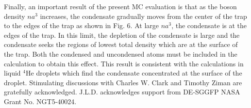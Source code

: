 \documentclass[aps,pra,twocolumn,groupedaddress]{revtex4}
\begin{document}
Finally, an important result of the present MC evaluation is that as the boson density $na^3$
increases, the condensate gradually moves from the center of the trap to the edges of the
trap as shown in Fig. 6.  At large $na^3$, the condensate is at the edges of the trap.
In this limit, the depletion of the condensate is large and the condensate seeks the regions
of lowest total density which are at the surface of the trap. Both the condensed
and uncondensed atoms must be included in the calculation to obtain this effect.  
This result is consistent with the calculations in liquid $^4$He droplets \cite{lewart88} 
which find the condensate concentrated at the surface of the droplet.
\acknowledgments
{
Stimulating discussions with Charles W. Clark and Timothy Ziman 
are gratefully acknowledged. 
J.L.D. acknowledges support from DE-SGGFP NASA Grant No. NGT5-40024. 
}
\end{document}
